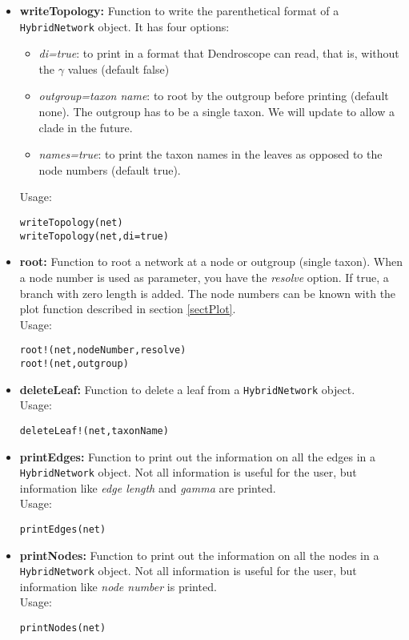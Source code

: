 \documentclass[12pt]{article}
\begin{document}
\begin{itemize}
\item \textbf{writeTopology:} Function to write the parenthetical
  format of a \texttt{HybridNetwork} object. It has four options:
\begin{itemize}
\item{\textit{di=true}: to print in a format that Dendroscope can
    read, that is, without the $\gamma$ values (default
  false)}
\item{\textit{outgroup=taxon name}: to root by the outgroup before
    printing (default none). The outgroup has to be a single taxon. We will update to
  allow a clade in the future.}
\item{\textit{names=true}: to print the taxon names in the leaves as opposed to
  the node numbers (default true).}
\end{itemize}
Usage:
\begin{lstlisting}
writeTopology(net)
writeTopology(net,di=true)
\end{lstlisting}

\item \textbf{root:} Function to root a network at a node or outgroup
  (single taxon). When a node number is used as parameter, you have
  the \textit{resolve} option. If true, a branch with zero length is
  added. The node numbers can be known with the plot function
  described in section \ref{sectPlot}.\\
Usage:
\begin{lstlisting}
root!(net,nodeNumber,resolve)
root!(net,outgroup)
\end{lstlisting}

\item \textbf{deleteLeaf:} Function to delete a leaf from a
  \texttt{HybridNetwork} object.\\
Usage:
\begin{lstlisting}
deleteLeaf!(net,taxonName)
\end{lstlisting}


\item \textbf{printEdges:} Function to print out the information on
  all the edges in a
  \texttt{HybridNetwork} object. Not all information is useful for the
  user, but information like \textit{edge length} and \textit{gamma}
  are printed.\\
Usage:
\begin{lstlisting}
printEdges(net)
\end{lstlisting}


\item \textbf{printNodes:} Function to print out the information on
  all the nodes in a
  \texttt{HybridNetwork} object. Not all information is useful for the
  user, but information like \textit{node number}
  is printed.\\
Usage:
\begin{lstlisting}
printNodes(net)
\end{lstlisting}

\end{itemize}
\end{document}
